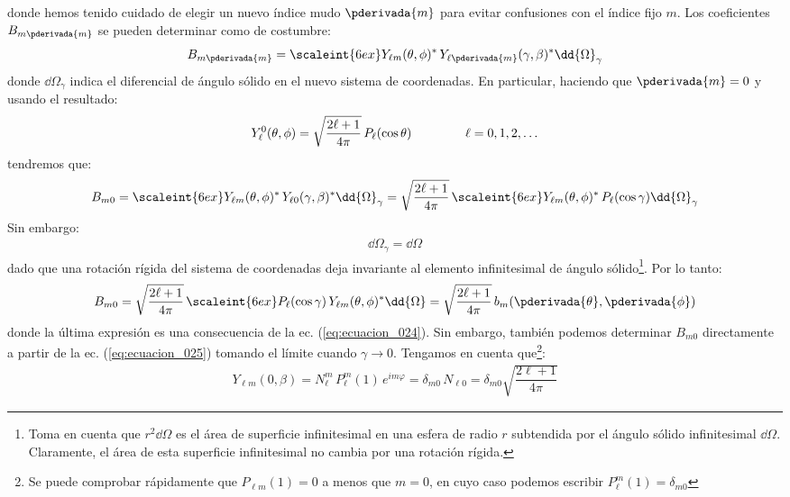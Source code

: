 donde hemos tenido cuidado de elegir un nuevo índice mudo $\pderivada{m}$ para evitar confusiones con el índice fijo $m$. Los coeficientes $B_{m \pderivada{m}}$ se pueden determinar como de costumbre:
\begin{align*}
B_{m \pderivada{m}} = \scaleint{6ex} Y_{\ell m} (\theta, \phi)^{*} \, Y_{\ell \pderivada{m}} (\gamma, \beta)^{*} \dd{\Omega}_{\gamma}
\end{align*}
donde $\dd{\Omega}_{\gamma}$ indica el diferencial de ángulo sólido en el nuevo sistema de coordenadas. En particular, haciendo que $\pderivada{m} = 0$ y usando el resultado:
\begin{align}
Y_{\ell}^{0} (\theta, \phi) = \sqrt{\dfrac{2 \ell + 1}{4 \pi}} \, P_{\ell} (\cos \theta) \hspace{1.5cm} \ell = 0, 1, 2, \ldots
\label{eq:ecuacion_013}
\end{align}
tendremos que:
\begin{align*}
B_{m 0} = \scaleint{6ex} Y_{\ell m} (\theta, \phi)^{*} \, Y_{\ell 0} (\gamma, \beta)^{*} \dd{\Omega}_{\gamma} = \sqrt{\dfrac{2 \ell + 1}{4 \pi}} \, \scaleint{6ex} Y_{\ell m} (\theta, \phi)^{*} \, P_{\ell} (\cos \gamma) \dd{\Omega}_{\gamma}
\end{align*}
Sin embargo:
\begin{align}
\dd{\Omega}_{\gamma} = \dd{\Omega}
\label{eq:ecuacion_026}
\end{align}
dado que una rotación rígida del sistema de coordenadas deja invariante al elemento infinitesimal de ángulo sólido\footnote{Toma en cuenta que $r^{2} \dd{\Omega}$ es el área de superficie infinitesimal en una esfera de radio $r$ subtendida por el ángulo sólido infinitesimal $\dd{\Omega}$. Claramente, el área de esta superficie infinitesimal no cambia por una rotación rígida.}. Por lo tanto:
\begin{align}
B_{m 0} = \sqrt{\dfrac{2 \ell + 1}{4 \pi}} \, \scaleint{6ex} P_{\ell} (\cos \gamma) \, Y_{\ell m} (\theta, \phi)^{*} \dd{\Omega} = \sqrt{\dfrac{2 \ell + 1}{4 \pi}} \, b_{m} (\pderivada{\theta}, \pderivada{\phi})
\label{eq:ecuacion_027}
\end{align}
donde la última expresión es una consecuencia de la ec. (\ref{eq:ecuacion_024}). Sin embargo, también podemos determinar $B_{m0}$ directamente a partir de la ec. (\ref{eq:ecuacion_025}) tomando el límite cuando $\gamma \to 0$. Tengamos en cuenta que\footnote{Se puede comprobar rápidamente que $P_{\ell m} (1) = 0$ a menos que $m = 0$, en cuyo caso podemos escribir $P_{\ell}^{m} (1) = \delta_{m 0}$}:
\begin{align*}
Y_{\ell m} (0, \beta) = N_{\ell}^{m} \, P_{\ell}^{m} (1) \, e^{i  m \varphi} = \delta_{m 0} \, N_{\ell 0} = \delta_{m 0} \sqrt{\dfrac{2 \ell + 1}{4 \pi}}
\end{align*}
